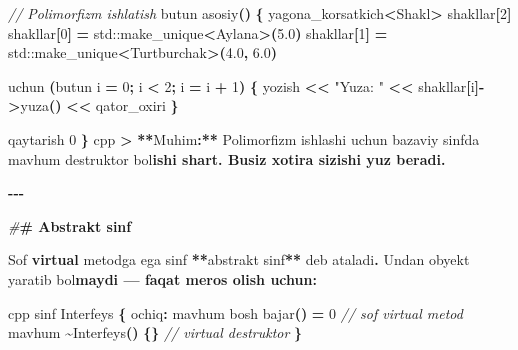 \documentclass[a4paper,11pt,twoside,openright]{book}
\newenvironment{Shaded}{\begin{snugshade}}{\end{snugshade}}
\newcommand{\BuiltInTok}[1]{#1}
\newcommand{\CharTok}[1]{\textcolor[rgb]{0.31,0.60,0.02}{#1}}
\newcommand{\CommentTok}[1]{\textcolor[rgb]{0.56,0.35,0.01}{\textit{#1}}}
\newcommand{\DecValTok}[1]{\textcolor[rgb]{0.00,0.00,0.81}{#1}}
\newcommand{\ErrorTok}[1]{\textcolor[rgb]{0.64,0.00,0.00}{\textbf{#1}}}
\newcommand{\FloatTok}[1]{\textcolor[rgb]{0.00,0.00,0.81}{#1}}
\newcommand{\KeywordTok}[1]{\textcolor[rgb]{0.13,0.29,0.53}{\textbf{#1}}}
\newcommand{\NormalTok}[1]{#1}
\newcommand{\OperatorTok}[1]{\textcolor[rgb]{0.81,0.36,0.00}{\textbf{#1}}}
\newcommand{\PreprocessorTok}[1]{\textcolor[rgb]{0.56,0.35,0.01}{\textit{#1}}}
\newcommand{\StringTok}[1]{\textcolor[rgb]{0.31,0.60,0.02}{#1}}
\begin{document}
\begin{Shaded}
\begin{Highlighting}[]
\CommentTok{// Polimorfizm ishlatish}
\NormalTok{butun asosiy}\OperatorTok{()} \OperatorTok{\{}
\NormalTok{    yagona\_korsatkich}\OperatorTok{\textless{}}\NormalTok{Shakl}\OperatorTok{\textgreater{}}\NormalTok{ shakllar}\OperatorTok{[}\DecValTok{2}\OperatorTok{]}
\NormalTok{    shakllar}\OperatorTok{[}\DecValTok{0}\OperatorTok{]} \OperatorTok{=} \BuiltInTok{std::}\NormalTok{make\_unique}\OperatorTok{\textless{}}\NormalTok{Aylana}\OperatorTok{\textgreater{}(}\FloatTok{5.0}\OperatorTok{)}
\NormalTok{    shakllar}\OperatorTok{[}\DecValTok{1}\OperatorTok{]} \OperatorTok{=} \BuiltInTok{std::}\NormalTok{make\_unique}\OperatorTok{\textless{}}\NormalTok{Turtburchak}\OperatorTok{\textgreater{}(}\FloatTok{4.0}\OperatorTok{,} \FloatTok{6.0}\OperatorTok{)}

\NormalTok{    uchun }\OperatorTok{(}\NormalTok{butun i }\OperatorTok{=} \DecValTok{0}\OperatorTok{;}\NormalTok{ i }\OperatorTok{\textless{}} \DecValTok{2}\OperatorTok{;}\NormalTok{ i }\OperatorTok{=}\NormalTok{ i }\OperatorTok{+} \DecValTok{1}\OperatorTok{)} \OperatorTok{\{}
\NormalTok{        yozish }\OperatorTok{\textless{}\textless{}} \StringTok{"Yuza: "} \OperatorTok{\textless{}\textless{}}\NormalTok{ shakllar}\OperatorTok{[}\NormalTok{i}\OperatorTok{]{-}\textgreater{}}\NormalTok{yuza}\OperatorTok{()} \OperatorTok{\textless{}\textless{}}\NormalTok{ qator\_oxiri}
    \OperatorTok{\}}

\NormalTok{    qaytarish }\DecValTok{0}
\OperatorTok{\}}
\ErrorTok{\textasciigrave{}\textasciigrave{}\textasciigrave{}}\NormalTok{cpp}
\OperatorTok{\textgreater{}} \OperatorTok{**}\NormalTok{Muhim}\OperatorTok{:**}\NormalTok{ Polimorfizm ishlashi uchun bazaviy sinfda }\ErrorTok{\textasciigrave{}}\NormalTok{mavhum}\ErrorTok{\textasciigrave{}}\NormalTok{ destruktor bo}\CharTok{\textquotesingle{}l}\ErrorTok{ishi shart. Busiz xotira sizishi yuz beradi.}

\OperatorTok{{-}{-}{-}}

\PreprocessorTok{\#}\ErrorTok{\# Abstrakt sinf}

\NormalTok{Sof }\KeywordTok{virtual}\NormalTok{ metodga ega sinf }\OperatorTok{**}\NormalTok{abstrakt sinf}\OperatorTok{**}\NormalTok{ deb ataladi}\OperatorTok{.}\NormalTok{ Undan obyekt yaratib bo}\CharTok{\textquotesingle{}l}\ErrorTok{maydi — faqat meros olish uchun:}

\ErrorTok{\textasciigrave{}\textasciigrave{}\textasciigrave{}}\NormalTok{cpp}
\NormalTok{sinf Interfeys }\OperatorTok{\{}
\NormalTok{ochiq}\OperatorTok{:}
\NormalTok{    mavhum bosh bajar}\OperatorTok{()} \OperatorTok{=} \DecValTok{0}       \CommentTok{// sof virtual metod}
\NormalTok{    mavhum }\OperatorTok{\textasciitilde{}}\NormalTok{Interfeys}\OperatorTok{()} \OperatorTok{\{\}}        \CommentTok{// virtual destruktor}
\OperatorTok{\}}


\end{Highlighting}
\end{Shaded}
\end{document}
